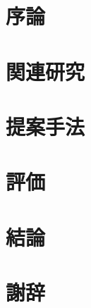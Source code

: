 \documentclass[12pt]{m-thesis}
\begin{document}





\pagestyle{headings}
\setcounter{page}{1}

\chapter{序論}
\label{chap:intro}


\chapter{関連研究}
\label{chap:related_work}


\chapter{提案手法}
\label{chap:design}


% 

\chapter{評価}
\label{chap:eval}


\chapter{結論}
\label{chap:conclusion}





\chapter*{謝辞}
\label{chap:acknowledgments}


% 
\end{document}
